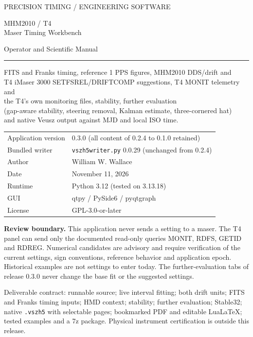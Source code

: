 \documentclass[11pt,a4paper]{article}
\renewcommand{\_}{\usscore\allowbreak}
\newcommand{\warning}[1]{\par\noindent\colorbox{light}{\parbox{\dimexpr\linewidth-2\fboxsep}{\textbf{Review boundary.} #1}}\par}
\begin{document}
\begin{titlepage}
{\sffamily\color{teal}\large PRECISION TIMING / ENGINEERING SOFTWARE\par}
\vspace{18mm}
{\sffamily\color{navy}\Huge MHM2010 / T4\\Maser Timing Workbench\par}
\vspace{5mm}
{\sffamily\Large Operator and Scientific Manual\par}
\vspace{9mm}
\rule{\linewidth}{1pt}
\vspace{5mm}
{\large FITS and Franks timing, reference 1 PPS figures, MHM2010 DDS/drift and\\
T4 iMaser 3000 SETFSREL/DRIFTCOMP suggestions, T4 MONIT telemetry and\\
the T4's own monitoring files, stability, further evaluation\\
(gap-aware stability, steering removal, Kalman estimate, three-cornered hat)\\
and native Veusz output against MJD and local ISO time.\par}
\vspace{12mm}
\begin{tabular}{@{}ll@{}}
Application version & 0.3.0 (all content of 0.2.4 to 0.1.0 retained)\\
Bundled writer & \texttt{vszh5\_writer.py} 0.0.29 (unchanged from 0.2.4)\\
Author & William W. Wallace\\
Date & November 11, 2026\\
Runtime & Python 3.12 (tested on 3.13.18)\\
GUI & qtpy / PySide6 / pyqtgraph\\
License & GPL-3.0-or-later\\
\end{tabular}
\vfill
\warning{This application never sends a setting to a maser. The T4 panel can
send only the documented read-only queries MONIT, RDFS, GETID and RDREG.
Numerical candidates are advisory and require verification of the current
settings, sign conventions, reference behavior and application epoch.
Historical examples are not settings to enter today. The further-evaluation
tabs of release 0.3.0 never change the base fit or the suggested settings.}
\vspace{5mm}
{\small Deliverable contract: runnable source; live interval fitting; both drift
units; FITS and Franks timing inputs; HMD context; stability; further evaluation;
Stable32; native \texttt{.vszh5} with selectable pages; bookmarked PDF and editable
LuaLaTeX; tested examples and a 7z package. Physical instrument certification is
outside this release.}
\end{titlepage}
\tableofcontents
\clearpage
{}
{}
\listoftables
\clearpage
{}
{}
\listoffigures
\clearpage
\end{document}
